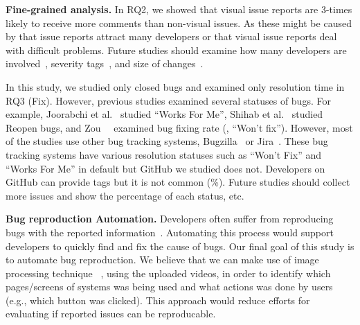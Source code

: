 \noindent
\textbf{Fine-grained analysis. }
In RQ2, we showed that visual issue reports are 3-times likely to receive more comments than non-visual issues. As these might be caused by that  issue reports attract many developers or that visual issue reports deal with difficult problems. Future studies should examine how many developers are involved~\citep{DBLP:conf/icsm/BavotaR15}, severity tags~\citep{DBLP:conf/issre/ZhouNG15}, and size of changes~\citep{DBLP:conf/kbse/HattoriL08}.

In this study, we studied only closed bugs and examined only resolution time in RQ3 (Fix). However, previous studies examined several statuses of bugs. For example, Joorabchi et al.~\citep{DBLP:conf/msr/JoorabchiMM14} studied ``Works For Me'', Shihab et al.~\citep{DBLP:journals/ese/ShihabIKIOAHM13} studied Reopen bugs, and Zou~\et~\citep{DBLP:conf/compsac/ZouXZCL15} examined bug fixing rate (\eg, ``Won't fix''). However, most of the studies use other bug tracking systems, Bugzilla~\citep{Bugzilla} or Jira~\citep{JIRA}. These bug tracking systems have various resolution statuses such as ``Won't Fix'' and ``Works For Me''  in default but GitHub we studied does not. Developers on GitHub can provide tags but it is not common (\%). Future studies should collect more issues and show the percentage of each status, etc. 

\noindent
\textbf{Bug reproduction Automation.}
Developers often suffer from reproducing bugs with the reported information~\citep{DBLP:conf/sigsoft/ChaparroLZMPMBN17}\citep{DBLP:conf/icsm/0001KC20}\citep{zimmermann2010TSE}.
Automating this process would support developers to quickly find and fix the cause of bugs. 
Our final goal of this study is to automate bug reproduction. 
We believe that we can make use of image processing technique ~\citep{DBLP:conf/nips/KrizhevskySH12}, using the uploaded videos, in order to identify which pages/screens of systems was being used and what actions was done by users (e.g., which button was clicked). 
This approach would reduce efforts for evaluating if reported issues can be reproducable. 



